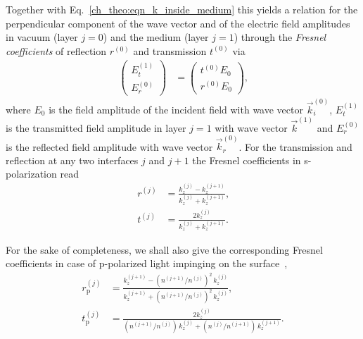 Together with Eq.~\ref{ch_theo:eqn_k_inside_medium} this yields a relation for the perpendicular component of the wave vector and of the electric field amplitudes in vacuum (layer $j=0$) and the medium (layer $j=1$) through the \emph{Fresnel coefficients} of reflection $r^{(0)}$ and transmission $t^{(0)}$ via
\begin{align}
\begin{pmatrix}
E_t^{(1)}  \\ 
E_r^{(0)}
\end{pmatrix} &=
\begin{pmatrix}
t^{(0)} E_0 \\
r^{(0)} E_0
\end{pmatrix} \text{,} \label{ch_theo:eqn_fresnel_reflection}
\end{align}
where $E_0$ is the field amplitude of the incident field with wave vector $\vec{k}_i^{(0)}$, $E_t^{(1)}$ is the transmitted field amplitude in layer $j=1$ with wave vector $\vec{k}^{(1)}$ and $E_r^{(0)}$ is the reflected field amplitude with wave vector $\vec{k}_r^{(0)}$. For the transmission and reflection at any two interfaces $j$ and $j+1$ the Fresnel coefficients in s-polarization read
\begin{align}
        r^{(j)} &= \frac{k_z^{(j)} - k_z^{(j+1)}}{k_z^{(j)} + 
k_z^{(j+1)}}\text{,}  \label{ch_theo:eqn_fresnel_reflection_coefficient}\\
        t^{(j)} &= \frac{2 k_z^{(j)}}{k_z^{(j)} + k_z^{(j+1)}}\text{.}  \label{ch_theo:eqn_fresnel_transmission_coefficient}
\end{align}

For the sake of completeness, we shall also give the corresponding Fresnel coefficients in case of p-polarized light impinging on the surface~\cite{born_principles_1965},
\begin{align}
        r_\text{p}^{(j)} &= \frac{k_z^{(j+1)} - (n^{(j+1)}/ n^{(j)})^2 \,k_z^{(j)}}{k_z^{(j+1)} + (n^{(j+1)}/ n^{(j)})^2\, k_z^{(j)}}\text{,}  \label{ch_theo:eqn_fresnel_reflection_coefficient}\\
        t_\text{p}^{(j)} &= \frac{2 k_z^{(j)}}{(n^{(j+1)}/ n^{(j)}) \,k_z^{(j)} +  (n^{(j)}/ n^{(j+1)})\, k_z^{(j+1)}}\text{.}  \label{ch_theo:eqn_fresnel_transmission_coefficient_p_pol}
\end{align}


